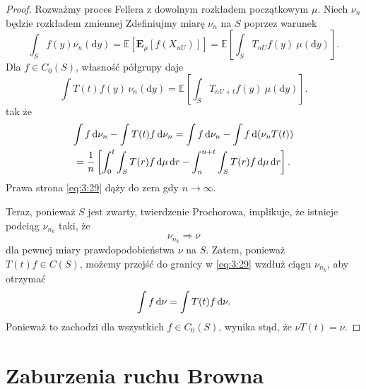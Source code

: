 \documentclass{article}
\begin{document}
	\begin{proof}
		Rozważmy proces Fellera z dowolnym rozkładem początkowym $\mu$.
		Niech $\nu_n$ będzie rozkładem zmiennej 
		Zdefiniujmy miarę $\nu_n$ na $S$ poprzez warunek
		\[
			\int_S f(y) \nu_n( \mathrm{d}y) = 
			\mathbb{E} \left[ \mathbf{E}_\mu \left[ f(X_{nU}) \right] \right]=
			\mathbb{E} \left[ \int_S T_{nU}f(y) \: \mu(\mathrm{d}y) \right].
		\]
		Dla $f \in C_0(S)$, własność półgrupy daje
		\[
			\int T(t)f(y) \, \nu_n (\mathrm{d}y)=
			\mathbb{E} \left[ \int_S T_{nU+t}f(y) \: \mu(\mathrm{d}y) \right].
		\]
		tak że
		\begin{multline}\label{eq:3:29}
			\int f \, \mathrm{d}\nu_n - \int T(t)f \, \mathrm{d}\nu_n 
			= \int f \, \mathrm{d}\nu_n - \int f \, \mathrm{d}(\nu_n T(t))\\
			= \frac{1}{n} \left[ \int_0^t \int_S T(r)f \, \mathrm{d}\mu \, \mathrm{d} r - 
			\int_n^{n+t} \int_S T(r)f \, \mathrm{d}\mu \, \mathrm{d} r \right].
		\end{multline}
		Prawa strona \eqref{eq:3:29} dąży do zera gdy $n \to \infty$.

		Teraz, ponieważ $S$ jest zwarty, twierdzenie Prochorowa, implikuje, 
		że istnieje podciąg $\nu_{n_k}$ taki, że
		\[
			\nu_{n_k} \Rightarrow \nu
		\]
		dla pewnej miary prawdopodobieństwa $\nu$ na $S$. 
		Zatem, ponieważ $T(t)f \in C(S)$, możemy przejść do granicy w \eqref{eq:3:29} 
		wzdłuż ciągu $\nu_{n_k}$, aby otrzymać
		\[
			\int f \, \mathrm{d}\nu = \int T(t)f \, \mathrm{d}\nu.
		\]
		Ponieważ to zachodzi dla wszystkich $f \in C_0(S)$, wynika stąd, że $\nu T(t) = \nu$.
	\end{proof}

	\section{Zaburzenia ruchu Browna}
\end{document}
